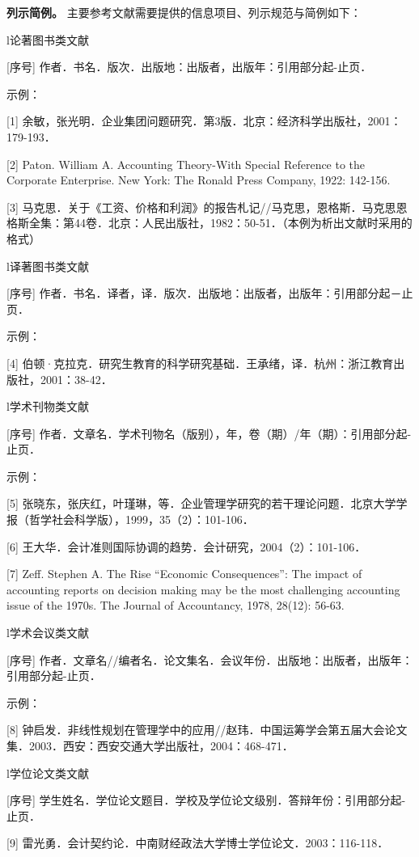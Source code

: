 \documentclass[singlesided]{Style/ucasthesis}%
\begin{document}
\textbf{列示简例。} 主要参考文献需要提供的信息项目、列示规范与简例如下：

l论著图书类文献

{[}序号{]} 作者．书名．版次．出版地：出版者，出版年：引用部分起-止页．

示例：

{[}1{]} 余敏，张光明．企业集团问题研究．第3版．北京：经济科学出版社，2001：179-193．

{[}2{]} Paton. William A. Accounting Theory-With Special Reference to the Corporate Enterprise. New York: The Ronald Press Company, 1922: 142-156.

{[}3{]} 马克思．关于《工资、价格和利润》的报告札记//马克思，恩格斯．马克思恩格斯全集：第44卷．北京：人民出版社，1982：50-51．（本例为析出文献时采用的格式）

l译著图书类文献

{[}序号{]} 作者．书名．译者，译．版次．出版地：出版者，出版年：引用部分起－止页．

示例：

{[}4{]} 伯顿·克拉克．研究生教育的科学研究基础．王承绪，译．杭州：浙江教育出版社，2001：38-42．

l学术刊物类文献

{[}序号{]} 作者．文章名．学术刊物名（版别），年，卷（期）/年（期）：引用部分起-止页．

示例：

{[}5{]} 张晓东，张庆红，叶瑾琳，等．企业管理学研究的若干理论问题．北京大学学报（哲学社会科学版），1999，35（2）：101-106．

{[}6{]} 王大华．会计准则国际协调的趋势．会计研究，2004（2）：101-106．

{[}7{]} Zeff. Stephen A. The Rise ``Economic Consequences'': The impact of accounting reports on decision making may be the most challenging accounting issue of the 1970s. The Journal of Accountancy, 1978, 28(12): 56-63.

l学术会议类文献

{[}序号{]} 作者．文章名//编者名．论文集名．会议年份．出版地：出版者，出版年：引用部分起-止页．

示例：

{[}8{]} 钟启发．非线性规划在管理学中的应用//赵玮．中国运筹学会第五届大会论文集．2003．西安：西安交通大学出版社，2004：468-471．

l学位论文类文献

{[}序号{]} 学生姓名．学位论文题目．学校及学位论文级别．答辩年份：引用部分起-止页．

{[}9{]} 雷光勇．会计契约论．中南财经政法大学博士学位论文．2003：116-118．
\end{document}
